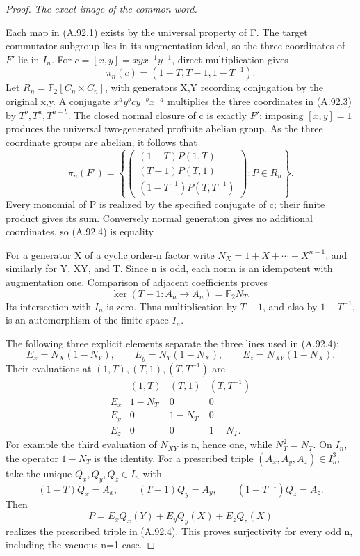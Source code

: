 \begin{proof}
\emph{The exact image of the common word.}\par
Each map in (A.92.1) exists by the universal property of F.
The target commutator subgroup lies in its augmentation ideal,
so the three coordinates of \(F'\) lie in \(I_n\). For
\(c=[x,y]=xyx^{-1}y^{-1}\), direct multiplication gives
\[
       \pi_n(c)=(1-T,T-1,1-T^{-1}).
\tag{A.92.3}
\]
Let \(R_n=\mathbb F_2[C_n\times C_n]\), with generators
X,Y recording conjugation by the original x,y. A conjugate
\(x^ay^b c y^{-b}x^{-a}\) multiplies the three coordinates
in (A.92.3) by \(T^b,T^a,T^{a-b}\). The closed normal
closure of c is exactly \(F'\): imposing \([x,y]=1\)
produces the universal two-generated profinite abelian group.
As the three coordinate groups are abelian, it follows that
\[
 \pi_n(F')=
 \left\{
 \begin{pmatrix}
 (1-T)P(1,T)\\ (T-1)P(T,1)\\
 (1-T^{-1})P(T,T^{-1})
 \end{pmatrix}:P\in R_n\right\}.
\tag{A.92.4}
\]
Every monomial of P is realized by the specified conjugate of c;
their finite product gives its sum. Conversely normal generation
gives no additional coordinates, so (A.92.4) is equality.

For a generator X of a cyclic order-n factor write
\(N_X=1+X+\cdots+X^{n-1}\), and similarly for Y, XY, and T.
Since n is odd, each norm is an idempotent with augmentation one.
Comparison of adjacent coefficients proves
\[
 \ker(T-1:A_n\to A_n)=\mathbb F_2N_T.
\]
Its intersection with \(I_n\) is zero. Thus multiplication
by \(T-1\), and also by \(1-T^{-1}\), is an automorphism
of the finite space \(I_n\).

The following three explicit elements separate the three lines
used in (A.92.4):
\[
 E_x=N_X(1-N_Y),\qquad
 E_y=N_Y(1-N_X),\qquad
 E_z=N_{XY}(1-N_X).
\tag{A.92.5}
\]
Their evaluations at \((1,T),(T,1),(T,T^{-1})\) are
\[
\begin{array}{c|ccc}
 & (1,T)&(T,1)&(T,T^{-1})\\ \hline
 E_x&1-N_T&0&0\\
 E_y&0&1-N_T&0\\
 E_z&0&0&1-N_T.
\end{array}
\tag{A.92.6}
\]
For example the third evaluation of \(N_{XY}\) is n, hence
one, while \(N_T^2=N_T\). On \(I_n\), the operator
\(1-N_T\) is the identity. For a prescribed triple
\((A_x,A_y,A_z)\in I_n^3\), take the unique \(Q_x,Q_y,Q_z\in I_n\)
with
\[
 (1-T)Q_x=A_x,\qquad (T-1)Q_y=A_y,
 \qquad (1-T^{-1})Q_z=A_z.
\]
Then
\[
       P=E_xQ_x(Y)+E_yQ_y(X)+E_zQ_z(X)
\]
realizes the prescribed triple in (A.92.4). This proves
surjectivity for every odd n, including the vacuous n=1 case.


\end{proof}
